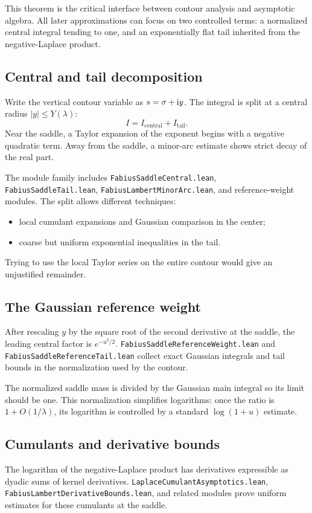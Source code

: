 \documentclass[11pt,oneside]{article}
\theoremstyle{definition}
\theoremstyle{remark}
\begin{document}
This theorem is the critical interface between contour analysis and asymptotic algebra.  All later approximations can focus on two controlled terms: a normalized central integral tending to one, and an exponentially flat tail inherited from the negative-Laplace product.

\subsection{Central and tail decomposition}
Write the vertical contour variable as \(s=\sigma+\mathrm{i} y\).  The integral is split at a central radius \(|y|\leq Y(\lambda)\):
\[
  I=I_{\mathrm{central}}+I_{\mathrm{tail}}.
\]
Near the saddle, a Taylor expansion of the exponent begins with a negative quadratic term.  Away from the saddle, a minor-arc estimate shows strict decay of the real part.

The module family includes \nolinkurl{FabiusSaddleCentral.lean}, \nolinkurl{FabiusSaddleTail.lean}, \nolinkurl{FabiusLambertMinorArc.lean}, and reference-weight modules.  The split allows different techniques:
\begin{itemize}
  \item local cumulant expansions and Gaussian comparison in the center;
  \item coarse but uniform exponential inequalities in the tail.
\end{itemize}
Trying to use the local Taylor series on the entire contour would give an unjustified remainder.

\subsection{The Gaussian reference weight}
After rescaling \(y\) by the square root of the second derivative at the saddle, the leading central factor is \(e^{-u^2/2}\).  \nolinkurl{FabiusSaddleReferenceWeight.lean} and \nolinkurl{FabiusSaddleReferenceTail.lean} collect exact Gaussian integrals and tail bounds in the normalization used by the contour.

The normalized saddle mass is divided by the Gaussian main integral so its limit should be one.  This normalization simplifies logarithms: once the ratio is \(1+O(1/\lambda)\), its logarithm is controlled by a standard \(\log(1+u)\) estimate.

\subsection{Cumulants and derivative bounds}
The logarithm of the negative-Laplace product has derivatives expressible as dyadic sums of kernel derivatives.  \nolinkurl{LaplaceCumulantAsymptotics.lean}, \nolinkurl{FabiusLambertDerivativeBounds.lean}, and related modules prove uniform estimates for these cumulants at the saddle.
\end{document}
